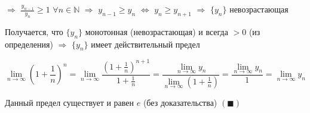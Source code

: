 \documentclass[class=article,a4paper,12pt,crop=false]{standalone}
\begin{document}
$\Rightarrow$ $\frac{y_{n - 1}}{y_n} \geq 1$ $\forall n \in \mathbb{N}$ $\Rightarrow$
$y_{n - 1} \geq y_n$ $\Leftrightarrow$ $y_n \geq y_{n + 1}$ $\Rightarrow$ $\{y_n\}$
невозрастающая

Получается, что $\{y_n\}$ монотонная (невозрастающая) и всегда $> 0$ (из определения)
$\Rightarrow$ $\{y_n\}$ имеет действительный предел

\begin{equation}
    \lim\limits_{n \rightarrow \infty}{\left(1 + \frac{1}{n}\right)^n} =
    \lim\limits_{n \rightarrow \infty}{\frac{\left(1 + \frac{1}{n}\right)^{n + 1}}{1 + \frac{1}{n}}} =
    \frac{\lim\limits_{n \rightarrow \infty}y_n}{\lim\limits_{n \rightarrow \infty}{\left(1 + \frac{1}{n}\right)}} =
    \frac{\lim\limits_{n \rightarrow \infty}y_n}{1} = \lim\limits_{n \rightarrow \infty}y_n
\end{equation}

Данный предел существует и равен $e$ (без доказательства) $(\blacksquare)$
\end{document}

